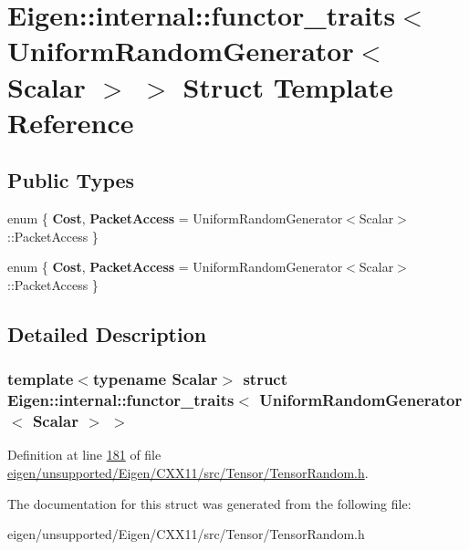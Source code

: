 \hypertarget{struct_eigen_1_1internal_1_1functor__traits_3_01_uniform_random_generator_3_01_scalar_01_4_01_4}{}\section{Eigen\+:\+:internal\+:\+:functor\+\_\+traits$<$ Uniform\+Random\+Generator$<$ Scalar $>$ $>$ Struct Template Reference}
\label{struct_eigen_1_1internal_1_1functor__traits_3_01_uniform_random_generator_3_01_scalar_01_4_01_4}
\subsection*{Public Types}
\begin{DoxyCompactItemize}
\item 
\mbox{\label{struct_eigen_1_1internal_1_1functor__traits_3_01_uniform_random_generator_3_01_scalar_01_4_01_4_a42bb8592ae89d0bfa2c5ce63fb15501c}} 
enum \{ {\bfseries Cost}, 
{\bfseries Packet\+Access} = Uniform\+Random\+Generator$<$Scalar$>$\+:\+:Packet\+Access
 \}
\item 
\mbox{\label{struct_eigen_1_1internal_1_1functor__traits_3_01_uniform_random_generator_3_01_scalar_01_4_01_4_aa5dd9e471a50026d6f859c577b668484}} 
enum \{ {\bfseries Cost}, 
{\bfseries Packet\+Access} = Uniform\+Random\+Generator$<$Scalar$>$\+:\+:Packet\+Access
 \}
\end{DoxyCompactItemize}


\subsection{Detailed Description}
\subsubsection*{template$<$typename Scalar$>$\newline
struct Eigen\+::internal\+::functor\+\_\+traits$<$ Uniform\+Random\+Generator$<$ Scalar $>$ $>$}



Definition at line \hyperlink{eigen_2unsupported_2_eigen_2_c_x_x11_2src_2_tensor_2_tensor_random_8h_source_l00181}{181} of file \hyperlink{eigen_2unsupported_2_eigen_2_c_x_x11_2src_2_tensor_2_tensor_random_8h_source}{eigen/unsupported/\+Eigen/\+C\+X\+X11/src/\+Tensor/\+Tensor\+Random.\+h}.



The documentation for this struct was generated from the following file\+:\begin{DoxyCompactItemize}
\item 
eigen/unsupported/\+Eigen/\+C\+X\+X11/src/\+Tensor/\+Tensor\+Random.\+h\end{DoxyCompactItemize}
